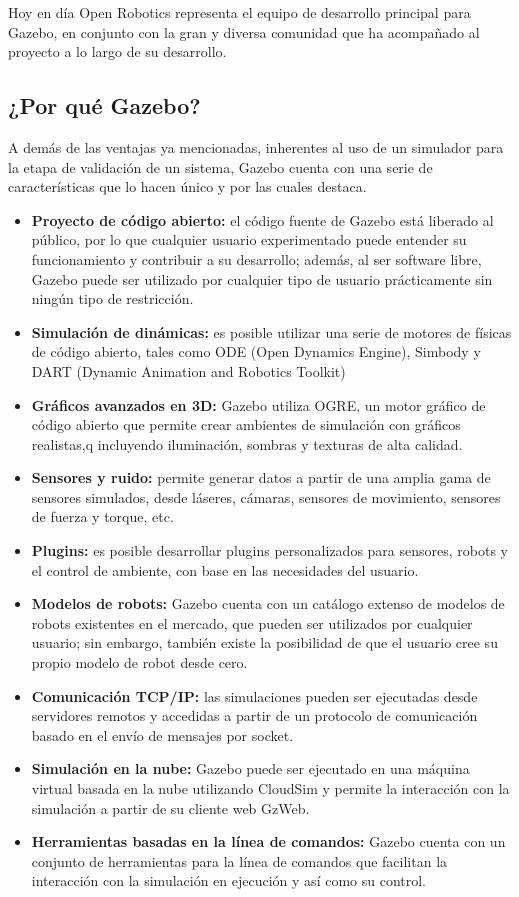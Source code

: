 Hoy en día Open Robotics representa el equipo de desarrollo principal para Gazebo, en conjunto con la gran y diversa comunidad que ha acompañado al proyecto a lo largo de su desarrollo.

\subsection{¿Por qué Gazebo?}
A demás de las ventajas ya mencionadas, inherentes al uso de un simulador para la etapa de validación de un sistema, Gazebo cuenta con una serie de características que lo hacen único y por las cuales destaca.

\begin{itemize}
    \item \textbf{Proyecto de código abierto:} el código fuente de Gazebo está liberado al público, por lo que cualquier usuario experimentado puede entender su funcionamiento y contribuir a su desarrollo; además, al ser software libre, Gazebo puede ser utilizado por cualquier tipo de usuario prácticamente sin ningún tipo de restricción. 
    \item \textbf{Simulación de dinámicas:} es posible utilizar una serie de motores de físicas de código abierto, tales como ODE (Open Dynamics Engine), Simbody y DART (Dynamic Animation and Robotics Toolkit)
    \item \textbf{Gráficos avanzados en 3D:} Gazebo utiliza OGRE, un motor gráfico de código abierto que permite crear ambientes de simulación con gráficos realistas,q incluyendo iluminación, sombras y texturas de alta calidad.
    \item \textbf{Sensores y ruido:} permite generar datos a partir de una amplia gama de sensores simulados, desde láseres, cámaras, sensores de movimiento, sensores de fuerza y torque, etc.
    \item \textbf{Plugins:} es posible desarrollar plugins personalizados para sensores, robots y el control de ambiente, con base en las necesidades del usuario. 
    \item \textbf{Modelos de robots:} Gazebo cuenta con un catálogo extenso de modelos de robots existentes en el mercado, que pueden ser utilizados por cualquier usuario; sin embargo, también existe la posibilidad de que el usuario cree su propio modelo de robot desde cero. 
    \item \textbf{Comunicación TCP/IP:} las simulaciones pueden ser ejecutadas desde servidores remotos y accedidas a partir de un protocolo de comunicación basado en el envío de mensajes por socket.
    \item \textbf{Simulación en la nube:} Gazebo puede ser ejecutado en una máquina virtual basada en la nube utilizando CloudSim y permite la interacción con la simulación a partir de su cliente web GzWeb.
    \item \textbf{Herramientas basadas en la línea de comandos:} Gazebo cuenta con un conjunto de herramientas para la línea de comandos que facilitan la interacción con la simulación en ejecución y así como su control.
\end{itemize}

